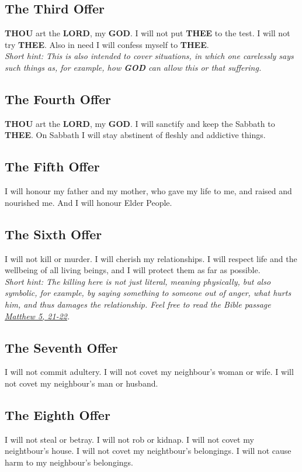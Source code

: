 \documentclass[12pt,a4paper]{article}
\newcommand{\God}[0]{\textbf{GOD}}
\newcommand{\Lord}[0]{\textbf{LORD}}
\newcommand{\Thee}[0]{\textbf{THEE}}
\newcommand{\Thou}[0]{\textbf{THOU}}
\begin{document}
	\subsection{The Third Offer}
		{\Thou} art the {\Lord},
		my {\God}.
		I will not put {\Thee} to the test.
		I will not try {\Thee}.
		Also in need I will confess myself to {\Thee}.
		\\
		\textit{Short hint:
		This is also intended to cover situations,
		in which one carelessly says such things as,
		for example,
		how {\God} can allow this or that suffering.}
		
	\subsection{The Fourth Offer}
		{\Thou} art the {\Lord},
		my {\God}.
		I will sanctify and keep the Sabbath to {\Thee}.
		On Sabbath I will stay abstinent of fleshly
		and addictive things.
		
	\subsection{The Fifth Offer}
		I will honour my father and my mother,
		who gave my life to me,
		and raised and nourished me.
		And I will honour Elder People.
			
	\subsection{The Sixth Offer}
		I will not kill or murder.
		I will cherish my relationships.
		I will respect life and the wellbeing of all living beings,
		and I will protect them as far as possible.
		\\
		\textit{Short hint:
		The killing here is not just literal,
		meaning physically,
		but also symbolic,
		for example,
		by saying something to someone out of anger,
		what hurts him,
		and thus damages the relationship.
		Feel free to read the Bible passage \href{https://www.die-bibel.de/bibeln/online-bibeln/lesen/ESV/MAT.5/Matthew-5}{Matthew 5, 21-22}.}
		
	\subsection{The Seventh Offer}
		I will not commit adultery.
		I will not covet my neighbour's woman or wife.
		I will not covet my neighbour's man or husband.
		
	\subsection{The Eighth Offer}
		I will not steal or betray.
		I will not rob or kidnap.
		I will not covet my neightbour's house.
		I will not covet my neightbour's belongings.
		I will not cause harm to my neighbour's belongings.
		
\end{document}
